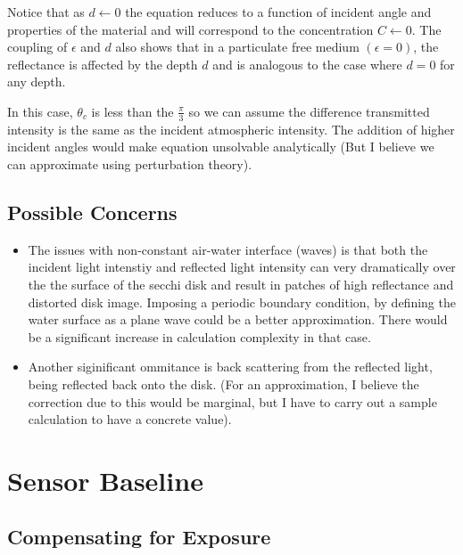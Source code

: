 \documentclass{article}
\begin{document}
Notice that as $d \leftarrow 0 $ the equation reduces to a function of incident angle and properties
of the material and will correspond to the concentration $ C \leftarrow 0 $. The coupling
of $ \epsilon$ and $d$ also shows that in a particulate free medium $(\epsilon = 0)$, the
reflectance is affected by the depth $ d$ and is analogous to the case where $ d = 0$ for
any depth.

In this case, $ \theta_c$ is less than the $ \frac{\pi}{3}$ so we can assume the
difference transmitted intensity is the same as the incident atmospheric intensity. The addition
of higher incident angles would make equation unsolvable analytically
(But I believe we can approximate using perturbation theory).

%


\subsection{Possible Concerns}

\begin{itemize}
  \item The issues with non-constant air-water interface (waves) is that both the incident
  light intenstiy and reflected light intensity can very dramatically over the the
  surface of the secchi disk and result in patches of high reflectance and distorted disk
  image. Imposing a periodic boundary condition, by defining the water surface as a plane
  wave could be a better approximation. There would be a significant increase in calculation
  complexity in that case.
  \item Another siginificant ommitance is back scattering from the reflected light, being reflected
  back onto the disk. (For an approximation, I believe the correction due to this would be
  marginal, but I have to carry out a sample calculation to have a concrete value).
\end{itemize}

\section{Sensor Baseline}

\subsection{Compensating for Exposure}
\end{document}
